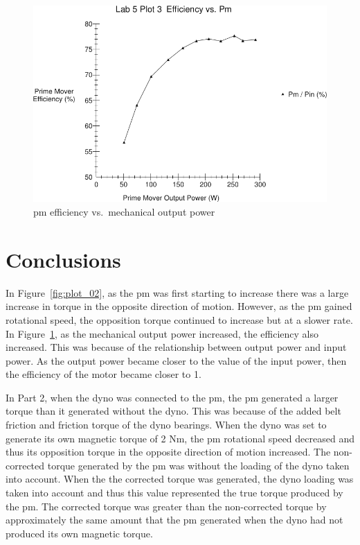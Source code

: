 \documentclass{article}
\begin{document}
\begin{figure}[H]
  \centering
  \includegraphics[width=\textwidth]{img/plot3}
  \caption{\gls{pm} efficiency vs.\ mechanical output power}
  \label{fig:plot_03}
\end{figure}

\section{Conclusions}

In Figure~\ref{fig:plot_02}, as the \gls{pm} was first starting to increase
there was a large increase in torque in the opposite direction of motion.
However, as the \gls{pm} gained rotational speed, the opposition torque
continued to increase but at a slower rate. In Figure~\ref{fig:plot_03}, as the
mechanical output power increased, the efficiency also increased. This was
because of the relationship between output power and input power. As the output
power became closer to the value of the input power, then the efficiency of the
motor became closer to 1.

In Part 2, when the \gls{dyno} was connected to the \gls{pm}, the \gls{pm}
generated a larger torque than it generated without the \gls{dyno}. This was
because of the added belt friction and friction torque of the \gls{dyno}
bearings.  When the \gls{dyno} was set to generate its own magnetic torque of 2
Nm, the \gls{pm} rotational speed decreased and thus its opposition torque in
the opposite direction of motion increased. The non-corrected torque generated
by the \gls{pm} was without the loading of the \gls{dyno} taken into
account. When the the corrected torque was generated, the \gls{dyno} loading
was taken into account and thus this value represented the true torque produced
by the \gls{pm}. The corrected torque was greater than the non-corrected torque
by approximately the same amount that the \gls{pm} generated when the
\gls{dyno} had not produced its own magnetic torque.
\end{document}
